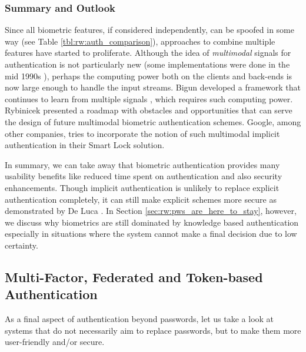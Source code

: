 	\subsubsection{Summary and Outlook}
	Since all biometric features, if considered independently, can be spoofed in some way (see Table \ref{tbl:rw:auth_comparison}), approaches to combine multiple features have started to proliferate. Although the idea of \textit{multimodal} signals for authentication is not particularly new (some implementations were done in the mid 1990s \cite{Brunelli1995PersonIdentificationMultipleCues}), perhaps the computing power both on the clients and back-ends is now large enough to handle the input streams. Bigun \etal developed a framework that continues to learn from multiple signals \cite{Bigun2005CombiningBiometricEvidence}, which requires such computing power.	Rybinicek \etal presented a roadmap with obstacles and opportunities \cite{Rybnicek2014RoadmapContinuousAuth} that can serve the design of future multimodal biometric authentication schemes. Google, among other companies, tries to incorporate the notion of such multimodal implicit authentication in their Smart Lock solution. 
	
	In summary, we can take away that biometric authentication provides many usability benefits like reduced time spent on authentication and also security enhancements. Though implicit authentication is unlikely to replace explicit authentication completely, it can still make explicit schemes more secure as demonstrated by De Luca \etal \cite{DeLuca2012TouchMeOnce}. In Section \ref{sec:rw:pws_are_here_to_stay}, however, we discuss why biometrics are still dominated by knowledge based authentication especially in situations where the system cannot make a final decision due to low certainty. 
	
	
		
	\subsection{Multi-Factor, Federated and Token-based Authentication}\label{sec:rw:shared_auth_tokens}
	As a final aspect of authentication beyond passwords, let us take a look at systems that do not necessarily aim to replace passwords, but to make them more user-friendly and/or secure. 
	
